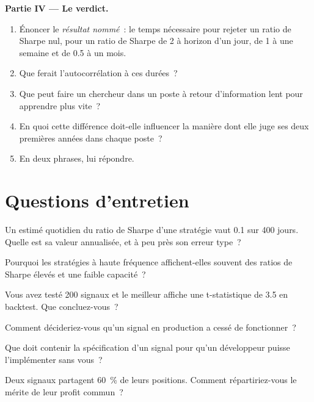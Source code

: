 \begin{problem}
\medskip\noindent\textbf{Partie IV --- Le verdict.}
\begin{enumerate}[resume]
\item Énoncer le \emph{résultat nommé}~: le temps nécessaire pour rejeter un ratio de Sharpe nul, pour un ratio de Sharpe de 2 à horizon d'un jour,
de 1 à une semaine et de 0.5 à un mois.
\item Que ferait l'autocorrélation à ces durées~?
\item Que peut faire un chercheur dans un poste à retour d'information lent pour apprendre plus vite~?
\item En quoi cette différence doit-elle influencer la manière dont elle juge ses deux premières années dans chaque poste~?
\item En deux phrases, lui répondre.
\end{enumerate}
\end{problem}

\section{Questions d'entretien}

\begin{interviewq}\label{iq:in:quant-researcher:1}
Un estimé quotidien du ratio de Sharpe d'une stratégie vaut 0.1 sur 400 jours. Quelle est sa valeur annualisée, et à peu près son erreur type~?
\end{interviewq}

\begin{interviewq}\label{iq:in:quant-researcher:2}
Pourquoi les stratégies à haute fréquence affichent-elles souvent des ratios de Sharpe élevés et une faible capacité~?
\end{interviewq}

\begin{interviewq}\label{iq:in:quant-researcher:3}
Vous avez testé 200 signaux et le meilleur affiche une t-statistique de 3.5 en backtest. Que concluez-vous~?
\end{interviewq}

\begin{interviewq}\label{iq:in:quant-researcher:4}
Comment décideriez-vous qu'un signal en production a cessé de fonctionner~?
\end{interviewq}

\begin{interviewq}\label{iq:in:quant-researcher:5}
Que doit contenir la spécification d'un signal pour qu'un développeur puisse l'implémenter sans vous~?
\end{interviewq}

\begin{interviewq}\label{iq:in:quant-researcher:6}
Deux signaux partagent 60~\% de leurs positions. Comment répartiriez-vous le mérite de leur profit commun~?
\end{interviewq}

